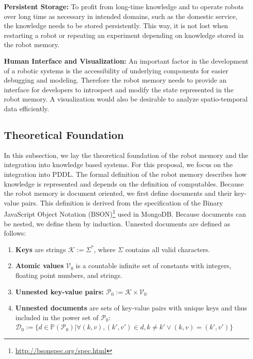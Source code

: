 \documentclass[a4paper,11pt]{article}
\begin{document}
\smallskip
\textbf{Persistent Storage:} To profit from long-time knowledge and to
operate robots over long time as necessary in intended domains,
such as the domestic service, the knowledge needs to be stored
persistently. This way, it is not lost when restarting a robot or
repeating an experiment depending on knowledge stored in the robot
memory.

\smallskip
\textbf{Human Interface and Visualization:} An important factor in the
development of a robotic systems is the accessibility of underlying
components for easier debugging and modeling. Therefore the robot
memory needs to provide an interface for developers to introspect and
modify the state represented in the robot memory. A visualization
would also be desirable to analyze spatio-temporal data efficiently.

\subsection{Theoretical Foundation}
\label{sec:formalism}
In this subsection, we lay the theoretical foundation of the robot
memory and the integration into knowledge based systems. For
this proposal, we focus on the integration into PDDL. 
The formal definition of the robot memory describes how knowledge is
represented and depends on the definition of computables. Because the
robot memory is document oriented, we first define documents and their
key-value pairs. This definition is derived from the specification of
the Binary JavaScript Object Notation
(BSON)\footnote{\url{http://bsonspec.org/spec.html}} used in MongoDB.
Because documents can be nested, we define them by induction. Unnested
documents are defined as follows:
\begin{enumerate}
\item \textbf{Keys} are strings $\mathcal{K} := \Sigma^*$, where
  $\Sigma$ contains all valid characters.
\item  \textbf{Atomic values} $\mathcal{V}_0$ is a countable infinite set of constants with
  integers, floating point numbers, and strings.
\item \textbf{Unnested key-value pairs:} $\mathcal{P}_0:=\mathcal{K}\times\mathcal{V}_0$
\item \textbf{Unnested documents} are sets of key-value pairs with
  unique keys and thus included in the power set of $\mathcal{P}_0$:\\
  $\mathcal{D}_0:=\{
  d\in\mathbb{P}(\mathcal{P}_0)|
  \forall (k,v),(k',v')\in d , k\neq k' \vee (k,v)=(k',v')
  \}$
\end{enumerate}
\end{document}
